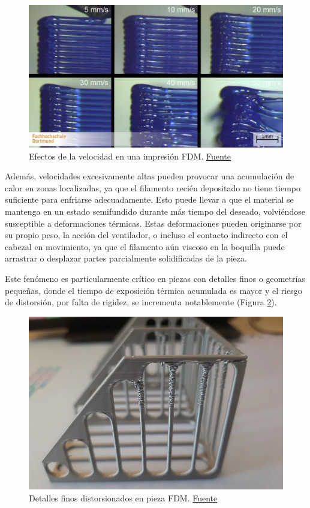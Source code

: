 \begin{figure}[h!]
	\centering
	\includegraphics[width=0.8\linewidth]{imgs/3dpvel.png}
	\caption{Efectos de la velocidad en una impresión FDM. \href{https://www.fh-dortmund.de/labore/additive-fertigung.php?loc=en-US}{Fuente}}
	\label{3dpvelfig}
\end{figure}


Además, velocidades excesivamente altas pueden provocar una acumulación de calor en zonas localizadas, ya que el filamento recién depositado no tiene tiempo suficiente para enfriarse adecuadamente. Esto puede llevar a que el material se mantenga en un estado semifundido durante más tiempo del deseado, volviéndose susceptible a deformaciones térmicas. Estas deformaciones pueden originarse por su propio peso, la acción del ventilador, o incluso el contacto indirecto con el cabezal en movimiento, ya que el filamento aún viscoso en la boquilla puede arrastrar o desplazar partes parcialmente solidificadas de la pieza.

Este fenómeno es particularmente crítico en piezas con detalles finos o geometrías pequeñas, donde el tiempo de exposición térmica acumulada es mayor y el riesgo de distorsión, por falta de rigidez, se incrementa notablemente (Figura \ref{thinfig}).

\begin{figure}[h!]
	\centering
	\includegraphics[width=0.7\linewidth]{imgs/thin.png}
	\caption{Detalles finos distorsionados en pieza FDM. \href{https://www.reddit.com/r/FixMyPrint/comments/1dd9nr5/thin_parts_get_very_inaccurate_after_a_specific/}{Fuente}}
	\label{thinfig}
\end{figure}


